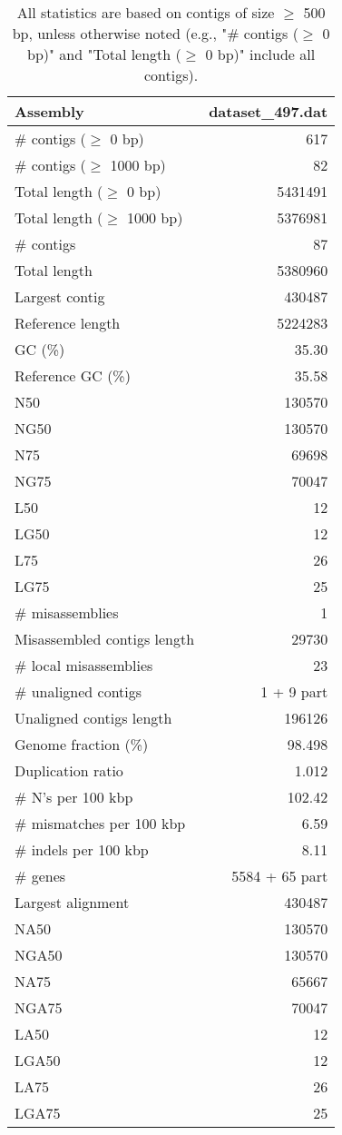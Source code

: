 \documentclass[12pt,a4paper]{article}
\begin{document}
\begin{table}[ht]
\begin{center}
\caption{All statistics are based on contigs of size $\geq$ 500 bp, unless otherwise noted (e.g., "\# contigs ($\geq$ 0 bp)" and "Total length ($\geq$ 0 bp)" include all contigs).}
\begin{tabular}{|l*{1}{|r}|}
\hline
Assembly & dataset\_497.dat \\ \hline
\# contigs ($\geq$ 0 bp) & 617 \\ \hline
\# contigs ($\geq$ 1000 bp) & 82 \\ \hline
Total length ($\geq$ 0 bp) & 5431491 \\ \hline
Total length ($\geq$ 1000 bp) & 5376981 \\ \hline
\# contigs & 87 \\ \hline
Total length & 5380960 \\ \hline
Largest contig & 430487 \\ \hline
Reference length & 5224283 \\ \hline
GC (\%) & 35.30 \\ \hline
Reference GC (\%) & 35.58 \\ \hline
N50 & 130570 \\ \hline
NG50 & 130570 \\ \hline
N75 & 69698 \\ \hline
NG75 & 70047 \\ \hline
L50 & 12 \\ \hline
LG50 & 12 \\ \hline
L75 & 26 \\ \hline
LG75 & 25 \\ \hline
\# misassemblies & 1 \\ \hline
Misassembled contigs length & 29730 \\ \hline
\# local misassemblies & 23 \\ \hline
\# unaligned contigs & 1 + 9 part \\ \hline
Unaligned contigs length & 196126 \\ \hline
Genome fraction (\%) & 98.498 \\ \hline
Duplication ratio & 1.012 \\ \hline
\# N's per 100 kbp & 102.42 \\ \hline
\# mismatches per 100 kbp & 6.59 \\ \hline
\# indels per 100 kbp & 8.11 \\ \hline
\# genes & 5584 + 65 part \\ \hline
Largest alignment & 430487 \\ \hline
NA50 & 130570 \\ \hline
NGA50 & 130570 \\ \hline
NA75 & 65667 \\ \hline
NGA75 & 70047 \\ \hline
LA50 & 12 \\ \hline
LGA50 & 12 \\ \hline
LA75 & 26 \\ \hline
LGA75 & 25 \\ \hline
\end{tabular}
\end{center}
\end{table}
\end{document}
